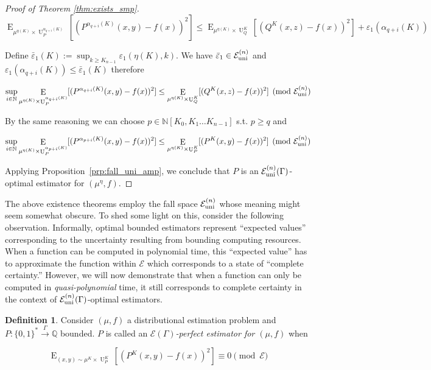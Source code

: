 \documentclass{article}
\numberwithin{equation}{section}
\theoremstyle{definition}
\newtheorem{definition}{Definition}[section]
\theoremstyle{plain}
\newcommand{\Bool}{\{0,1\}}
\newcommand{\Words}{{\Bool^*}}
\DeclareMathOperator{\E}{E}
\DeclareMathOperator{\Un}{U}
\newcommand{\Nats}{\mathbb{N}}
\newcommand{\Rats}{\mathbb{Q}}
\newcommand{\NatPoly}{\Nats[K_0, K_1 \ldots K_{n-1}]}
\newcommand{\Fall}{\mathcal{E}}
\newcommand{\EG}{\Fall(\Gamma)}
\newcommand{\FallU}{{\Fall_{\textnormal{uni}}^{(n)}}}
\newcommand{\Scheme}{\xrightarrow{\Gamma}}
\begin{document}
\begin{proof}[Proof of Theorem \ref{thm:exists_smp}]
\[\E_{\mu^{\eta(K)} \times \Un_P^{\alpha_{q+i}(K)}}[(P^{\alpha_{q+i}(K)}(x,y)-f(x))^2] \leq \E_{\mu^{\eta(K)} \times \Un_Q^K}[(Q^K(x,z)-f(x))^2] + \varepsilon_1(\alpha_{q+i}(K))\]

Define ${\bar{\varepsilon}_1(K):=\sup_{k \geq K_{n-1}}\varepsilon_1(\eta(K),k)}$. We have ${\bar{\varepsilon}_1 \in \FallU}$ and ${\varepsilon_1(\alpha_{q+i}(K)) \leq \bar{\varepsilon}_1(K)}$ therefore

\[\sup_{i \in \Nats} \E_{\mu^{\eta(K)} \times \Un_P^{\alpha_{q+i}(K)}}[(P^{\alpha_{q+i}(K)}(x,y)-f(x))^2] \leq \E_{\mu^{\eta(K)} \times \Un_Q^K}[(Q^K(x,z)-f(x))^2] \pmod \FallU\]

By the same reasoning we can choose ${p \in \NatPoly}$ s.t. ${p \geq q}$ and

\[\sup_{i \in \Nats} \E_{ \mu^{\eta(K)} \times \Un_P^{\alpha_{p+i}(K)}}[(P^{\alpha_{p+i}(K)}(x,y)-f(x))^2] \leq \E_{\mu^{\eta(K)} \times \Un_P^K}[(P^K(x,y)-f(x))^2] \pmod \FallU\]

Applying Proposition~\ref{prp:fall_uni_amp}, we conclude that ${P}$ is an ${\FallU(\Gamma)}$-optimal estimator for ${(\mu^\eta,f)}$.
%
\end{proof}

The above existence theorems employ the fall space ${\FallU}$ whose meaning might seem somewhat obscure. To shed some light on this, consider the following observation. Informally, optimal bounded estimators represent \enquote{expected values} corresponding to the uncertainty resulting from bounding computing resources. When a function can be computed in polynomial time, this \enquote{expected value} has to approximate the function within ${\Fall}$ which corresponds to a state of \enquote{complete certainty.} However, we will now demonstrate that when a function can only be computed in \emph{quasi-polynomial} time, it still corresponds to complete certainty in the context of ${\FallU(\Gamma)}$-optimal estimators.

\begin{samepage}
\begin{definition}

Consider ${(\mu, f)}$ a distributional estimation problem and ${P: \Words \Scheme \Rats}$ bounded. ${P}$ is called an \emph{${\EG}$-perfect estimator for ${(\mu,f)}$} when 

\begin{equation}
\E_{(x,y) \sim \mu^K \times \Un_P^K}[(P^K(x,y)-f(x))^2] \equiv 0 \pmod \Fall
\end{equation}

\end{definition}
\end{samepage}
\end{document}
